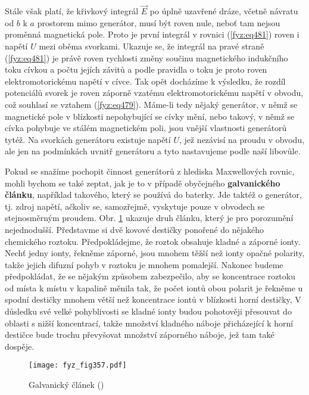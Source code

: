 {  Stále však platí, že křivkový integrál \(\vec{E}\) po úplně uzavřené dráze, včetně návratu od 
  \(b\) k \(a\) prostorem mimo generátor, musí být roven nule, neboť tam nejsou proměnná magnetická 
  pole. Proto je první integrál v rovnici (\ref{fyz:eq481}) roven i napětí \(U\) mezi oběma 
  svorkami. Ukazuje se, že integrál na pravé straně (\ref{fyz:eq481}) je právě roven rychlosti 
  změny součinu magnetického indukčního toku cívkou a počtu jejích závitů a podle pravidla o toku 
  je proto roven elektromotorickému napětí v cívce. Tak opět docházíme k výsledku, že rozdíl 
  potenciálů svorek je roven záporně vzatému elektromotorickému napětí v obvodu, což souhlasí se 
  vztahem (\ref{fyz:eq479}). Máme-li tedy nějaký generátor, v němž se magnetické pole v blízkosti 
  nepohybující se cívky mění, nebo takový, v němž se cívka pohybuje ve stálém magnetickém poli, 
  jsou vnější vlastnosti generátorů tytéž. Na svorkách generátoru existuje napětí \(U\), jež 
  nezávisí na proudu v obvodu, ale jen na podmínkách uvnitř generátoru a tyto nastavujeme podle 
  naší libovůle. 
  
  Pokud se snažíme pochopit činnost generátorů z hlediska Maxwellových rovnic, mohli bychom se také 
  zeptat, jak je to v případě obyčejného \textbf{galvanického článku}, například takového, který se 
  používá do baterky. Jde taktéž o generátor, tj. zdroj napětí, ačkoliv se, samozřejmě, vyskytuje 
  pouze v obvodech se stejnosměrným proudem. Obr. \ref{fyz:fig357} ukazuje druh článku, který je 
  pro porozumění nejednodušší. Představme si dvě kovové destičky ponořené do nějakého chemického 
  roztoku. Předpokládejme, že roztok obsahuje kladné a záporné ionty. Nechť jedny ionty, řekněme 
  záporné, jsou mnohem těžší než ionty opačné polarity, takže jejich difuzní pohyb v roztoku je 
  mnohem pomalejší. Nakonec budeme předpokládat, že se nějakým způsobem zabezpečilo, aby se 
  koncentrace roztoku od místa k místu v kapalině měnila tak, že počet iontů obou polarit je 
  řekněme u spodní destičky mnohem větší než koncentrace iontů v blízkosti horní destičky, V 
  důsledku své velké pohyblivosti se kladné ionty budou pohotověji přesouvat do oblasti s nižší 
  koncentrací, takže množství kladného náboje přicházející k horní destičce bude trochu převyšovat 
  množství záporného náboje, jež tam také dospěje.

  \begin{figure}[ht!] %
    \centering
    \texttt{[image: fyz\_fig357.pdf]}
    \caption{Galvanický článek
             (\cite[s.~398]{Feynman02})}
    \label{fyz:fig357}
  \end{figure}
  
}
